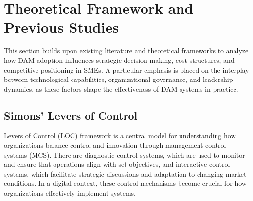\documentclass[a4paper,12pt,twocolumn]{article}
\begin{document}
\justifying
\fussy

\section{Theoretical Framework and Previous Studies}
This section builds upon existing literature and theoretical frameworks to analyze how DAM adoption influences 
strategic decision-making, cost structures, and competitive positioning in SMEs. A particular emphasis is placed 
on the interplay between technological capabilities, organizational governance, and leadership dynamics,
as these factors shape the effectiveness of DAM systems in practice.





\subsection{Simons’ Levers of Control}
\cite{simons1995} Levers of Control (LOC) framework is a central model for understanding how organizations 
balance control and innovation through management control systems (MCS). 
There are diagnostic control systems, which are used to monitor and ensure that operations 
align with set objectives, and interactive control systems, which facilitate strategic discussions and adaptation to 
changing market conditions. In a digital context, these control mechanisms become crucial for how organizations effectively 
implement systems.
\end{document}
